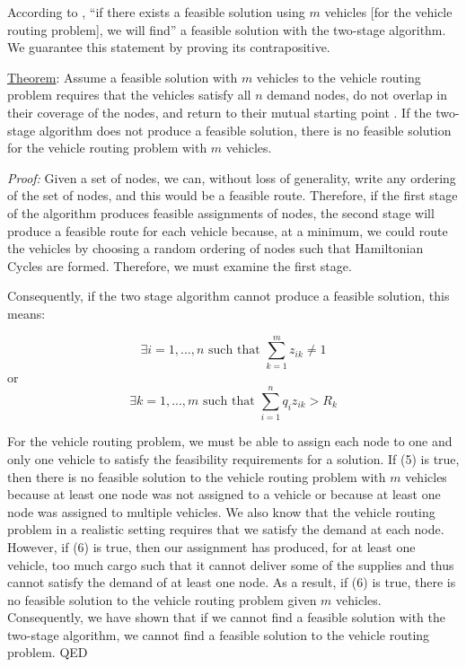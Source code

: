 \documentclass[11pt]{article}
\begin{document}
According to \cite{intro_logistics_book}, ``if there exists a feasible solution using $m$ vehicles [for the vehicle routing problem], we will find'' a feasible solution with the two-stage algorithm.  We guarantee this statement by proving its contrapositive.  
  

\vspace{1em}

\noindent \underline{Theorem}: Assume a feasible solution with $m$ vehicles to the vehicle routing problem requires that the vehicles satisfy all $n$ demand nodes, do not overlap in their coverage of the nodes, and return to their mutual starting point \cite{intro_logistics_book,VRP_textbook,eksioglu2009vehicle}.  If the two-stage algorithm does not produce a feasible solution, there is no feasible solution for the vehicle routing problem with $m$ vehicles.



\vspace{1em}

\noindent \textit{Proof:} Given a set of nodes, we can, without loss of generality, write any ordering of the set of nodes, and this would be a feasible route.  Therefore, if the first stage of the algorithm produces feasible assignments of nodes, the second stage will produce a feasible route for each vehicle because, at a minimum, we could route the vehicles by choosing a random ordering of nodes such that Hamiltonian Cycles are formed.  Therefore, we must examine the first stage.

Consequently, if the two stage algorithm cannot produce a feasible solution, this means: 

\begin{equation}
\exists i = 1,...,n \text{ such that } \sum_{k=1}^{m} z_{ik} \neq 1
\end{equation}
or
\begin{equation}
\exists k = 1,...,m \text{ such that } \sum_{i=1}^{n} q_{i} z_{ik} > R_{k} 
\end{equation}


\noindent For the vehicle routing problem, we must be able to assign each node to one and only one vehicle to satisfy the feasibility requirements for a solution.  If (5) is true, then there is no feasible solution to the vehicle routing problem with $m$ vehicles because at least one node was not assigned to a vehicle or because at least one node was assigned to multiple vehicles.  We also know that the vehicle routing problem in a realistic setting requires that we satisfy the demand at each node.  However, if (6) is true, then our assignment has produced, for at least one vehicle, too much cargo such that it cannot deliver some of the supplies and thus cannot satisfy the demand of at least one node.  As a result, if (6) is true, there is no feasible solution to the vehicle routing problem given $m$ vehicles.  Consequently, we have shown that if we cannot find a feasible solution with the two-stage algorithm, we cannot find a feasible solution to the vehicle routing problem. QED
\end{document}

